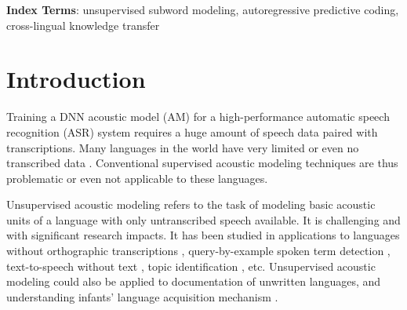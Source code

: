 \documentclass[a4paper]{article}
\begin{document}
\begin{abstract}

\end{abstract}
\noindent\textbf{Index Terms}: unsupervised subword modeling, autoregressive predictive coding, cross-lingual knowledge transfer

\section{Introduction}

Training a DNN acoustic model (AM) for a high-performance automatic speech recognition (ASR) system requires a huge amount of speech data paired with  transcriptions. 
Many languages in the world have very limited or even no transcribed data \cite{dunbar2017zero}. 
Conventional supervised acoustic modeling techniques are thus problematic or even not applicable to these languages.

Unsupervised acoustic modeling refers to the task of modeling basic acoustic units of a language with only untranscribed speech available. It is  challenging and  with significant research impacts. It has been studied in applications to languages without orthographic transcriptions \cite{I3EWang}, query-by-example spoken term detection \cite{Chen+2016}, text-to-speech without text \cite{Dunbar2019}, topic identification \cite{SiuGishChanEtAl2014}, etc. Unsupervised acoustic modeling could also be applied to documentation of unwritten languages, and understanding infants' language acquisition mechanism \cite{versteegh2015zero}. 
\end{document}
